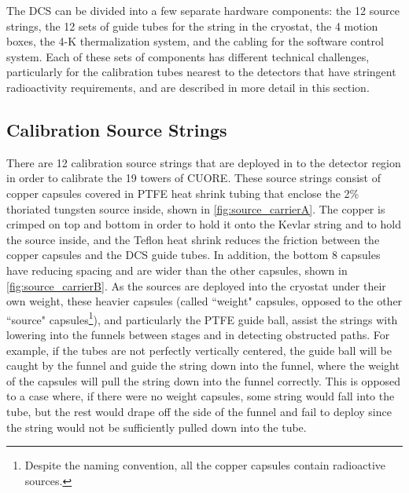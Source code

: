 The DCS can be divided into a few separate hardware components: the 12 source strings, the 12 sets of guide tubes for the string in the cryostat, the 4 motion boxes, the 4-K thermalization system, and the cabling for the software control system.
Each of these sets of components has different technical challenges, particularly for the calibration tubes nearest to the detectors that have stringent radioactivity requirements, and are described in more detail in this section.

\subsection*{Calibration Source Strings}
There are 12 calibration source strings that are deployed in to the detector region in order to calibrate the 19 towers of CUORE.
These source strings consist of copper capsules covered in PTFE heat shrink tubing that enclose the 2\% thoriated tungsten source inside, shown in \autoref{fig:source_carrierA}.
The copper is crimped on top and bottom in order to hold it onto the Kevlar string and to hold the source inside, and the Teflon heat shrink reduces the friction between the copper capsules and the DCS guide tubes. In addition, the bottom 8 capsules have reducing spacing and are wider than the other capsules, shown in \autoref{fig:source_carrierB}.
As the sources are deployed into the cryostat under their own weight, these heavier capsules (called ``weight" capsules, opposed to the other ``source" capsules\footnote{Despite the naming convention, all the copper capsules contain radioactive sources.}), and particularly the PTFE guide ball, assist the strings with lowering into the funnels between stages and in detecting obstructed paths.
For example, if the tubes are not perfectly vertically centered, the guide ball will be caught by the funnel and guide the string down into the funnel, where the weight of the capsules will pull the string down into the funnel correctly.
This is opposed to a case where, if there were no weight capsules, some string would fall into the tube, but the rest would drape off the side of the funnel and fail to deploy since the string would not be sufficiently pulled down into the tube.


